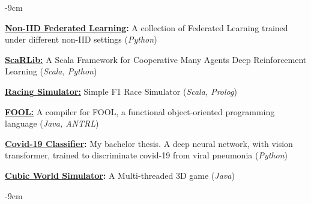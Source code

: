 \documentclass[10pt,a4paper]{altacv}
\begin{document}
\begin{adjustwidth}{}{-9cm}

    \textbf{\href{https://github.com/davidedomini/experiments-2025-lmcs-field-based-FL-baselines}{Non-IID Federated Learning}:} A collection of Federated Learning trained under different non-IID settings (\textit{Python})

    \divider

    \textbf{\href{https://github.com/ScaRLib-group/ScaRLib}{ScaRLib:}} A Scala Framework for Cooperative Many Agents Deep Reinforcement Learning (\textit{Scala, Python}) 
    
    \divider
    
    \textbf{\href{https://davidedomini.github.io/pps-22-sim-race/}{Racing Simulator:}} Simple F1 Race Simulator (\textit{Scala, Prolog})
    
    \divider
    
    \textbf{\href{https://github.com/davidedomini/FOOL-Compiler}{FOOL:}} A compiler for FOOL, a functional object-oriented programming language (\textit{Java, ANTRL})
    
    \divider
    
    \textbf{\href{https://amslaurea.unibo.it/24243/}{Covid-19 Classifier}:} My bachelor thesis. A deep neural network, with vision transformer, trained to discriminate covid-19 from viral pneumonia (\textit{Python}) 
    
    \divider
    
    \textbf{\href{https://github.com/davidedomini/CubicWorldSimulator}{Cubic World Simulator}:} A Multi-threaded 3D game (\textit{Java}) 
\end{adjustwidth}

\begin{adjustwidth}{}{-9cm}
        \renewcommand{\bibsection}{}
        \nocite{*}
        
        

\end{adjustwidth}
\end{document}

